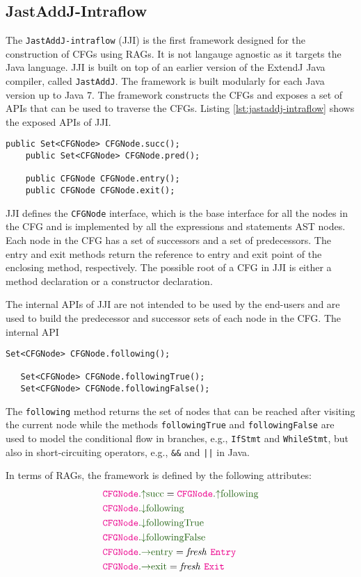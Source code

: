 \subsection{JastAddJ-Intraflow}
\label{sec:jastaddj-intraflow}
The \texttt{JastAddJ-intraflow} (JJI) is the first framework designed for the construction of CFGs
using RAGs. It is not langauge agnostic as it targets the Java language.
JJI is built on top of an earlier version of the ExtendJ Java compiler, called \texttt{JastAddJ}.
The framework is built modularly for each Java version up to Java 7. 
The framework constructs the CFGs and exposes a set of APIs that can be used to 
traverse the CFGs. Listing \ref{lst:jastaddj-intraflow} shows the exposed APIs of JJI.
\begin{lstlisting}[caption={JastAddJ-Intraflow APIs}, label={lst:jastaddj-intraflow}, language=JastAdd]
    public Set<CFGNode> CFGNode.succ();
    public Set<CFGNode> CFGNode.pred();

    public CFGNode CFGNode.entry();
    public CFGNode CFGNode.exit();
\end{lstlisting}
JJI defines the \texttt{CFGNode} interface, which is the base interface for all the nodes in the CFG
and is implemented by all the expressions and statements AST nodes. Each node in the CFG has a set of
successors and a set of predecessors. The entry and exit methods return the reference to entry and exit point of
the enclosing method, respectively.
The possible root of a CFG in JJI is either a method declaration or a constructor declaration. 

The internal APIs of JJI are not intended to be used by the end-users and are used
to build the predecessor and successor sets of each node in the CFG.
The internal API
\begin{lstlisting}[caption={JastAddJ-Intraflow Internal APIs}, label={lst:jastaddj-intraflow-internal}, language=JastAdd]
   Set<CFGNode> CFGNode.following();

   Set<CFGNode> CFGNode.followingTrue();
   Set<CFGNode> CFGNode.followingFalse();
\end{lstlisting}
The \texttt{following} method returns the set of nodes that can be reached after
visiting the current node while the methods \texttt{followingTrue} and \texttt{followingFalse}
are used to model the conditional flow in branches, e.g., \texttt{IfStmt} and \texttt{WhileStmt}, but
also in short-circuiting operators, e.g., \texttt{\&\&} and \texttt{||} in Java.

In terms of RAGs, the framework is defined by the following attributes:
\begin{align*}
    &\Asyn{CFGNode}{succ} = \Asyn{CFGNode}{following} \\
    &\Ainh{CFGNode}{following}  \\
    &\Ainh{CFGNode}{followingTrue}  \\
    &\Ainh{CFGNode}{followingFalse}  \\
    &\Ahoa{CFGNode}{entry} = \text{\emph{fresh }} \astnode{Entry}\\
    &\Ahoa{CFGNode}{exit} = \text{\emph{fresh }} \astnode{Exit}
\end{align*}

